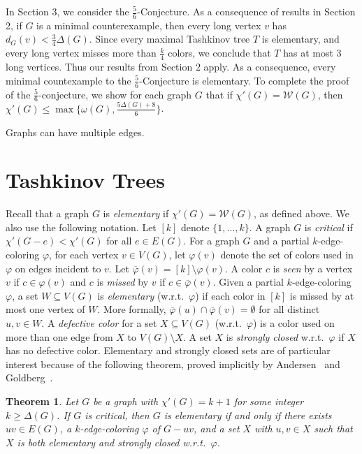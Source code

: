 \documentclass[12pt]{amsart}
\theoremstyle{plain}
\newtheorem{thm}{Theorem}
\theoremstyle{definition}
\theoremstyle{remark}
\newcommand{\fancy}[1]{\mathcal{#1}}
\newcommand{\W}{\fancy{W}}
\newcommand{\vph}{\varphi}
\newcommand{\vphn}{\overline{\varphi}}
\begin{document}
In Section 3, we consider the %
$\frac56$-Conjecture.  As a consequence of results in Section 2,
if $G$ is a minimal counterexample, then every long vertex $v$ has
$d_G(v)<\frac34\Delta(G)$.  Since every maximal Tashkinov tree $T$ is
elementary, and every long vertex misses more than $\frac{k}4$ colors, we
conclude that $T$ has at most 3 long vertices.  Thus our results from
Section 2 apply.  As a consequence, every minimal countexample to the
$\frac56$-Conjecture is elementary.  To complete the proof of the $\frac56$-conjecture,
we show for each graph $G$ that if $\chi'(G)=\W(G)$, then
$\chi'(G)\le\max\{\omega(G),\frac{5\Delta(G)+8}6\}$.


Graphs can have multiple edges.

\section{Tashkinov Trees}
Recall that a graph $G$ is \emph{elementary} if $\chi'(G)=\W(G)$, as defined
above.  We also use the following notation.  
Let $[k]$ denote $\{1,\ldots,k\}$.
A graph $G$ is \emph{critical} if $\chi'(G-e) < \chi'(G)$ for all $e \in E(G)$. 
For a graph $G$ and a partial $k$-edge-coloring $\varphi$, for each vertex $v\in
V(G)$, let $\varphi(v)$ denote the set of colors used in $\varphi$ on edges
incident to $v$.  Let $\vphn(v)=[k]\setminus\varphi(v)$.  A color $c$ is
\emph{seen} by a vertex $v$ if $c\in \varphi(v)$ and $c$ is \emph{missed} by $v$
if $c\in\vphn(v)$.
Given a partial $k$-edge-coloring $\varphi$, a set $W\subseteq V(G)$ is
\emph{elementary} (w.r.t.~$\varphi$) if each color in $[k]$ is
missed by at most one vertex of $W$.  More formally, $\vphn(u)\cap
\vphn(v)=\emptyset$ for all distinct $u,v\in W$.
A \emph{defective color} for a set $X\subseteq V(G)$ (w.r.t.~$\varphi$) is a color
used on more than one edge from $X$ to $V(G) \setminus X$.  
A set $X$ is \emph{strongly closed} w.r.t.~$\varphi$ if $X$ has no 
defective color.
Elementary and strongly closed sets are of particular interest because of the
following theorem, proved implicitly by Andersen~\cite{} and Goldberg~\cite{}.
% 

\begin{thm}
\label{elementary}
Let $G$ be a graph with $\chi'(G)=k+1$ for some integer $k\ge \Delta(G)$.  If
$G$ is critical, then $G$ is elementary if and only if there exists $uv\in E(G)$,
a $k$-edge-coloring $\vph$ of $G-uv$, and a set $X$ with $u,v\in X$ such
that $X$ is both elementary and strongly closed w.r.t.~$\varphi$.
\end{thm}
\end{document}
